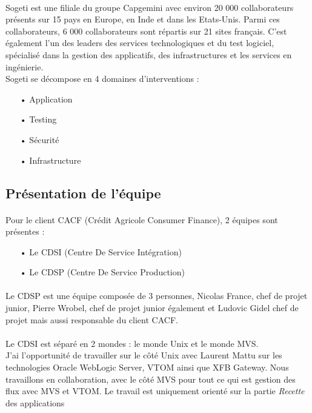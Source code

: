 \documentclass[a4paper,12pt]{report}
\begin{document}
	\paragraph*{}
	Sogeti est une filiale du groupe Capgemini avec environ 20 000 collaborateurs présents sur 15 pays en Europe, en Inde et dans les Etats-Unis. Parmi ces collaborateurs, 6 000 collaborateurs sont répartis sur 21 sites français. C'est également l’un des leaders des services technologiques et du test logiciel, spécialisé dans la gestion des applicatifs, des infrastructures et les services en ingénierie.\\
	Sogeti se décompose en 4 domaines d'interventions :\\
	\begin{itemize}
		\item[•] Application
		\item[•] Testing
		\item[•] Sécurité
		\item[•] Infrastructure
	\end{itemize}
	
	\subsection{Présentation de l'équipe}
	\paragraph*{}
	Pour le client CACF (Crédit Agricole Consumer Finance), 2 équipes sont présentes :\\
	\begin{itemize}
		\item[•] Le CDSI (Centre De Service Intégration)
		\item[•] Le CDSP (Centre De Service Production)
	\end{itemize}
	
	\paragraph*{}
	Le CDSP est une équipe composée de 3 personnes, Nicolas France, chef de projet junior, Pierre Wrobel, chef de projet junior également et Ludovic Gidel chef de projet mais aussi responsable du client CACF.
	
	\paragraph*{}
	Le CDSI est séparé en 2 mondes : le monde Unix et le monde MVS.\\
	J'ai l'opportunité de travailler sur le côté Unix avec Laurent Mattu sur les technologies Oracle WebLogic Server, VTOM ainsi que XFB Gateway. Nous travaillons en collaboration, avec le côté MVS pour tout ce qui est gestion des flux avec MVS et VTOM.	Le travail est uniquement orienté sur la partie \textit{Recette} des applications
	
\end{document}
